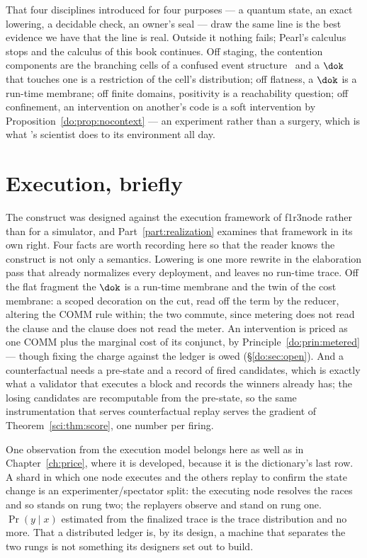 That four disciplines introduced for four purposes --- a quantum state, an exact lowering, a
decidable check, an owner's seal --- draw the same line is the best evidence we have that the line
is real. Outside it nothing fails; Pearl's calculus stops and the calculus of this book continues.
Off staging, the contention components are the branching cells of a confused event
structure~\cite{AbbesBenveniste} and a $\dok$ that touches one is a restriction of the cell's
distribution; off flatness, a $\dok$ is a run-time membrane; off finite domains, positivity is a
reachability question; off confinement, an intervention on another's code is a soft intervention
by Proposition~\ref{do:prop:nocontext} --- an experiment rather than a surgery, which is what
\chSci's scientist does to its environment all day.

\section{Execution, briefly}
\label{do:sec:execution}

The construct was designed against the execution framework of f1r3node rather than for a
simulator, and Part~\ref{part:realization} examines that framework in its own right. Four facts
are worth recording here so that the reader knows the construct is not only a semantics. Lowering is one more rewrite in the elaboration pass that already normalizes
every deployment, and leaves no run-time trace. Off the flat fragment the $\dok$ is a run-time
membrane and the twin of the cost membrane: a scoped decoration on the cut, read off the term by
the reducer, altering the COMM rule within; the two commute, since metering does not read the
clause and the clause does not read the meter. An intervention is priced as one COMM plus the
marginal cost of its conjunct, by Principle~\ref{do:prin:metered} --- though fixing the charge
against the ledger is owed (\S\ref{do:sec:open}). And a counterfactual needs a pre-state and a
record of fired candidates, which is exactly what a validator that executes a block and records
the winners already has; the losing candidates are recomputable from the pre-state, so the same
instrumentation that serves counterfactual replay serves the gradient of
Theorem~\ref{sci:thm:score}, one number per firing.

One observation from the execution model belongs here as well as in
Chapter~\ref{ch:price}, where it is developed, because it is the dictionary's last row. A shard in which one node executes and the others replay to confirm the
state change is an experimenter/spectator split: the executing node resolves the races and so
stands on rung two; the replayers observe and stand on rung one. $\Pr(y \mid x)$ estimated from
the finalized trace is the trace distribution and no more. That a distributed ledger is, by its
design, a machine that separates the two rungs is not something its designers set out to build.

